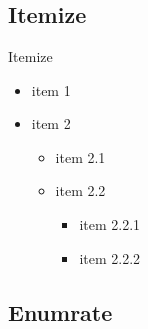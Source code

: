 \documentclass[aspectratio=169, dvipdfmx, 14pt, xcolor={svgnames,dvipsnames}]{beamer}
\begin{document}
\appendix

\backupbegin

\AtBeginSection[]{
}
\AtBeginSubsection[]{
}

\section{\appendixname}


\frame{\tableofcontents}


\subsection{Itemize}


\begin{frame}{Itemize}
  \begin{itemize}
    \item item 1
    \item \alert{item 2}
          \begin{itemize}
            \item item 2.1
            \item \alert{item 2.2}
                  \begin{itemize}
                    \item item 2.2.1
                    \item \alert{item 2.2.2}
                  \end{itemize}
          \end{itemize}
  \end{itemize}
\end{frame}


\subsection{Enumrate}

\end{document}
